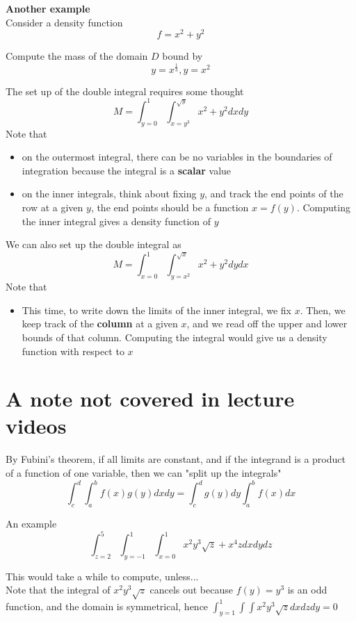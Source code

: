 \textbf{Another example} \\

Consider a density function
\[
  f = x^2 + y^2
\] 


Compute the mass of the domain $D$ bound by \[
   y = x^{ \frac{1}{3}}, y = x^2
\] 

The set up of the double integral requires some thought \[
   M = \int_{y = 0}^{1} \int_{x=y^3}^{\sqrt{y}} x^2 + y^2 dx dy
\] 
Note that
\begin{itemize}
   \item on the outermost integral, there can be no variables in the boundaries of integration because the integral is a \textbf{scalar} value
   \item on the inner integrals, think about fixing $y$, and track the end points of the row at a given $y$, the end points should be a function $x = f(y)$. Computing the inner integral gives a density function of $y$
\end{itemize}

We can also set up the double integral as  \[
   M = \int_{x = 0}^{1} \int_{y = x^2}^{\sqrt{x}} x^2 + y^2 dy dx
\] 
Note that
\begin{itemize}
   \item This time, to write down the limits of the inner integral, we fix $x$. Then, we keep track of the \textbf{column} at a given $x$, and we read off the upper and lower bounds of that column. Computing the integral would give us a density function with respect to $x$
\end{itemize}

\section{A note not covered in lecture videos}

By Fubini's theorem, if all limits are constant, and if the integrand is a product of a function of one variable, then we can "split up the integrals"
\[
   \int_{c}^{d} \int_{a}^{b} f(x) g(y) dx dy = \int_{c}^{d} g(y) dy \int_{a}^{b} f(x) dx
\] 

An example
\[
   \int_{z = 2}^{5} \int_{y=-1}^{1} \int_{x=0}^{1} x^2 y^3 \sqrt{z} + x^4 z dx dy dz
\] 

This would take a while to compute, unless... \\

Note that the integral of $x^2 y^3 \sqrt{z}$ cancels out because $f(y) = y^3$ is an odd function, and the domain is symmetrical, hence $\int_{y = 1}^{1} \int \int x^2 y^3 \sqrt{z} dx dz dy = 0$ \\

